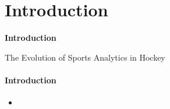 \section{Introduction}

\begin{frame}
    \centering
    \LARGE \textbf{\textcolor{structure}{Introduction}}
\end{frame}

\begin{frame}{The Evolution of Sports Analytics in Hockey}
    \framesubtitle{Introduction}
    \begin{itemize}
    \item  
    \end{itemize} 
    
\end{frame}
